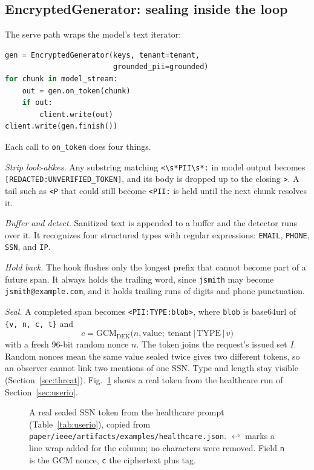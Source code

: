 \documentclass[conference,compsoc]{IEEEtran}
\newcommand{\code}[1]{\texttt{#1}}
\begin{document}
\subsection{EncryptedGenerator: sealing inside the loop}
\label{sec:generator}

The serve path wraps the model's text iterator:
\begin{lstlisting}[language=Python]
gen = EncryptedGenerator(keys, tenant=tenant,
                         grounded_pii=grounded)
for chunk in model_stream:
    out = gen.on_token(chunk)
    if out:
        client.write(out)
client.write(gen.finish())
\end{lstlisting}
Each call to \code{on\_token} does four things.

\emph{Strip look-alikes.} Any substring matching \lstinline!<\s*PII\s*:! in model output becomes \code{[REDACTED:UNVERIFIED\_TOKEN]}, and its body is dropped up to the closing \code{>}. A tail such as \code{<P} that could still become \code{<PII:} is held until the next chunk resolves it.

\emph{Buffer and detect.} Sanitized text is appended to a buffer and the detector runs over it. It recognizes four structured types with regular expressions: \code{EMAIL}, \code{PHONE}, \code{SSN}, and \code{IP}.

\emph{Hold back.} The hook flushes only the longest prefix that cannot become part of a future span. It always holds the trailing word, since \code{jsmith} may become \code{jsmith@example.com}, and it holds trailing runs of digits and phone punctuation.

\emph{Seal.} A completed span becomes \code{<PII:TYPE:blob>}, where \code{blob} is base64url of \code{\{v, n, c, t\}} and
\begin{equation}
  c = \mathrm{GCM}_{\mathrm{DEK}}\big(n, \text{value};\ \text{tenant}\,|\,\text{TYPE}\,|\,v\big)
  \label{eq:seal}
\end{equation}
with a fresh 96-bit random nonce $n$. The token joins the request's issued set $I$. Random nonces mean the same value sealed twice gives two different tokens, so an observer cannot link two mentions of one SSN. Type and length stay visible (Section~\ref{sec:threat}). Fig.~\ref{fig:token} shows a real token from the healthcare run of Section~\ref{sec:userio}.

\begin{figure}[!t]

\caption{A real sealed SSN token from the healthcare prompt (Table~\ref{tab:userio}), copied from \code{paper/ieee/artifacts/examples/healthcare.json}. $\hookleftarrow$ marks a line wrap added for the column; no characters were removed. Field \code{n} is the GCM nonce, \code{c} the ciphertext plus tag.}
\label{fig:token}
\end{figure}
\end{document}
